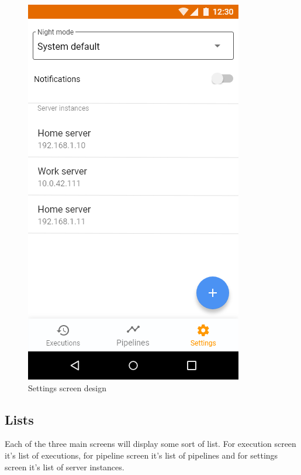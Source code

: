 \begin{figure}
\begin{minipage}[b]{0.32\textwidth}
    	\includegraphics[width=\textwidth]{pics/xd/Bottom Navigation - settings.png}
    	\caption[Settings]{Settings screen design}\label{fig:xdSettings}
    \end{minipage}
\end{figure}

\subsection{Lists}
Each of the three main screens will display some sort of list.
For execution screen it's list of executions, for pipeline screen it's list of pipelines and for settings screen it's list of server instances.

